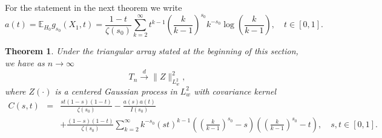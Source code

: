 \documentclass{article}
\theoremstyle{thm}
\newtheorem{theorem}{Theorem}[section]
\theoremstyle{def}
\begin{document}
For the statement in the next theorem we write
\[
a(t) = \mathbb E_{H_0}g_{s_0}(X_1,t)= \frac{1-t}{\zeta(s_0)} \sum_{k=2}^\infty t^{k-1} \left( \frac{k}{k-1} \right)^{s_0} k^{-s_0} \log\left( \frac{k}{k-1} \right),\quad t\in[0,1].
\]
\begin{theorem}\label{thm:limitnull}
Under the triangular array stated at the beginning of this section, we have as \( n \to \infty \)
\[
T_n \xrightarrow{d} \| Z \|^2_{L^2_w},
\]
where \( Z(\cdot) \) is a centered Gaussian process in $L_w^2$ with covariance kernel
\begin{eqnarray*}
C(s, t) &=& \frac{st (1-s)(1-t)}{\zeta(s_0)}- \frac{a(s)a(t)}{I(s_0)}\\&&
+ \frac{(1-s)(1-t)}{\zeta(s_0)} \sum_{k=2}^\infty k^{-s_0} (st)^{k-1} \left( \left(\frac k {k-1}\right)^{s_0} - s \right)\left( \left(\frac k {k-1}\right)^{s_0} - t \right) , \quad s,t\in[0,1].
\end{eqnarray*}
\end{theorem}
\end{document}
